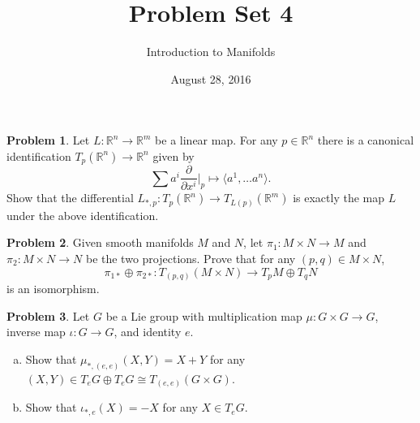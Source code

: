 \documentclass{amsart}
\newcommand{\+}[1]{\ensuremath{\mathbf{#1}}}
\newcommand{\R}{{\mathbb R}}
\theoremstyle{definition}
\newtheorem{prob}{Problem}
\begin{document}
\title{Problem Set 4}
\date{August 28, 2016}
\author{Introduction to Manifolds}

\maketitle




\begin{prob}
 Let $L: \R^n \to \R^m$ be a linear map.  For any $p \in \R^n$ there is a canonical identification $T_p(\R^n) \to \R^n$
 given by 
 \[
  \sum {a^i} \frac{\partial}{\partial x^i}\bigg|_p \mapsto \langle a^1, \ldots a^n \rangle.
 \]
 Show that the differential $L_{*,p}: T_p(\R^n) \to T_{L(p)}(\R^m)$ is exactly the map $L$
 under the above identification.
\end{prob}


\begin{prob}
Given smooth manifolds $M$ and $N$, let $\pi_1: M \times N \to M$
and $\pi_2: M \times N \to N$ be the two projections.
Prove that for any $(p,q) \in M \times N$,
\[
\pi_{1*} \oplus \pi_{2*}: T_{(p,q)}(M \times N) \to T_pM \oplus T_qN
\]
is an isomorphism.
\end{prob}


\begin{prob}
Let $G$ be a Lie group with multiplication map $\mu: G \times G \to G$, inverse map $\iota: G \to G$, and identity $e$.
\begin{enumerate}[(a)]
 \item Show that $\mu_{*,(e,e)}(X,Y) = X + Y$
 for any $(X,Y) \in T_eG \oplus T_eG \cong T_{(e,e)}(G \times G)$.
 \item Show that $\iota_{*,e}(X) = -X$ for
 any $X \in T_eG$.
\end{enumerate}
\end{prob}
\end{document}
